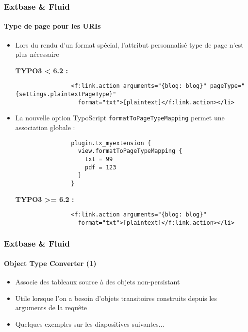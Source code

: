 
\begin{frame}[fragile]
	\frametitle{Extbase \& Fluid}
	\framesubtitle{Type de page pour les URIs}

	\lstset{
		basicstyle=\tiny\ttfamily
	}

	\begin{itemize}
		\item Lors du rendu d'un format spécial, l'attribut personnalisé type de page n'est plus nécessaire

			\smaller\textbf{TYPO3 < 6.2 :}\normalsize
			\begin{lstlisting}
				<f:link.action arguments="{blog: blog}" pageType="{settings.plaintextPageType}"
				  format="txt">[plaintext]</f:link.action></li>
			\end{lstlisting}

		\item La nouvelle option TypoScript \texttt{formatToPageTypeMapping} permet une association globale :

			\begin{lstlisting}
				plugin.tx_myextension {
				  view.formatToPageTypeMapping {
				    txt = 99
				    pdf = 123
				  }
				}
			\end{lstlisting}

			\smaller\textbf{TYPO3 >= 6.2 :}\normalsize
			\begin{lstlisting}
				<f:link.action arguments="{blog: blog}"
				  format="txt">[plaintext]</f:link.action></li>
			\end{lstlisting}

	\end{itemize}

\end{frame}


\begin{frame}[fragile]
	\frametitle{Extbase \& Fluid}
	\framesubtitle{Object Type Converter (1)}

	\begin{itemize}
		\item Associe des tableaux source à des objets non-persistant
		\item Utile lorsque l'on a besoin d'objets transitoires construits depuis les arguments de la requête
		\item Quelques exemples sur les diapositives suivantes...

	\end{itemize}

\end{frame}

